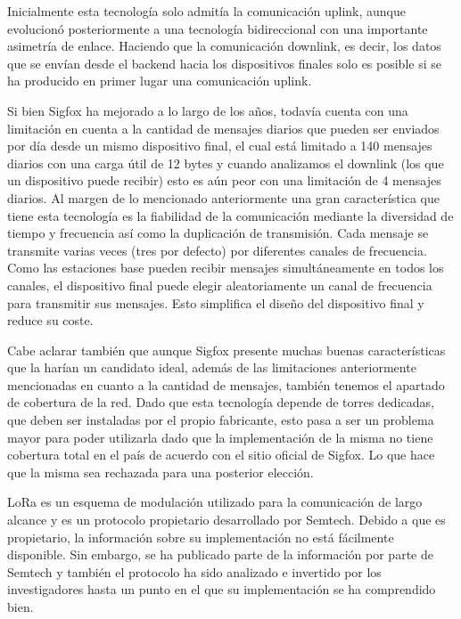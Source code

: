 Inicialmente esta tecnología solo admitía la comunicación uplink, aunque evolucionó posteriormente a una tecnología bidireccional con una importante asimetría de enlace. Haciendo que la comunicación downlink, es decir, los datos que se envían desde el backend hacia los dispositivos finales solo es posible si se ha producido en primer lugar una comunicación uplink.

Si bien Sigfox ha mejorado a lo largo de los años, todavía cuenta con una limitación en cuenta a la cantidad de mensajes diarios que pueden ser enviados por día desde un mismo dispositivo final, el cual está limitado a 140 mensajes diarios con una carga útil de 12 bytes y cuando analizamos el downlink (los que un dispositivo puede recibir) esto es aún peor con una limitación de 4 mensajes diarios. Al margen de lo mencionado anteriormente una gran característica que tiene esta tecnología es la fiabilidad de la comunicación mediante la diversidad de tiempo y frecuencia así como la duplicación de transmisión. Cada mensaje se transmite varias veces
(tres por defecto) por diferentes canales de frecuencia. Como las estaciones base pueden recibir mensajes simultáneamente en todos los canales, el dispositivo final puede elegir aleatoriamente un canal de frecuencia para transmitir sus mensajes. Esto simplifica el diseño del dispositivo final y reduce su coste.

Cabe aclarar también que aunque Sigfox presente muchas buenas características que la harían un candidato ideal, además de las limitaciones anteriormente mencionadas en cuanto a la cantidad de mensajes, también tenemos el apartado de cobertura de la red. Dado que esta tecnología depende de torres dedicadas, que deben ser instaladas por el propio fabricante, esto pasa a ser un problema mayor para poder utilizarla dado que la implementación de la misma no tiene cobertura total en el país de acuerdo con el sitio oficial de Sigfox. Lo que hace que la misma sea rechazada para una posterior elección.

LoRa es un esquema de modulación utilizado para la comunicación de largo alcance y es un protocolo propietario desarrollado por Semtech. Debido a que es propietario, la información sobre su implementación no está fácilmente disponible. Sin embargo, se ha publicado parte de la información por parte de Semtech y también el protocolo ha sido analizado e invertido por los investigadores hasta un punto en el que su implementación se ha comprendido bien.

